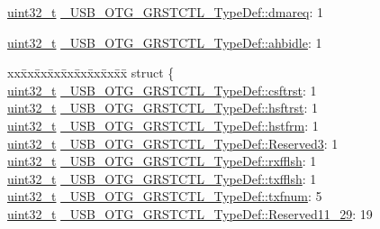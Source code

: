 \begin{DoxyCompactItemize}
\item 
\hyperlink{stdint_8h_a435d1572bf3f880d55459d9805097f62}{uint32\-\_\-t} \hyperlink{group___u_s_b___o_t_g___d_r_i_v_e_r_gad333c8546ac5b74a5a3ef8eb9377268d}{\-\_\-\-U\-S\-B\-\_\-\-O\-T\-G\-\_\-\-G\-R\-S\-T\-C\-T\-L\-\_\-\-Type\-Def\-::dmareq}\-: 1
\item 
\hyperlink{stdint_8h_a435d1572bf3f880d55459d9805097f62}{uint32\-\_\-t} \hyperlink{group___u_s_b___o_t_g___d_r_i_v_e_r_ga4247e798442e482943bbb22ed25cb1eb}{\-\_\-\-U\-S\-B\-\_\-\-O\-T\-G\-\_\-\-G\-R\-S\-T\-C\-T\-L\-\_\-\-Type\-Def\-::ahbidle}\-: 1
\item 
\begin{tabbing}
xx\=xx\=xx\=xx\=xx\=xx\=xx\=xx\=xx\=\kill
struct \{\\
\>\hyperlink{stdint_8h_a435d1572bf3f880d55459d9805097f62}{uint32\_t} \hyperlink{group___u_s_b___o_t_g___d_r_i_v_e_r_gaff6144b9dc68f62487e3e19efcff1a20}{\_USB\_OTG\_GRSTCTL\_TypeDef::csftrst}: 1\\
\>\hyperlink{stdint_8h_a435d1572bf3f880d55459d9805097f62}{uint32\_t} \hyperlink{group___u_s_b___o_t_g___d_r_i_v_e_r_ga0ce950fb04d37c6bfb5ca18fc740b3d3}{\_USB\_OTG\_GRSTCTL\_TypeDef::hsftrst}: 1\\
\>\hyperlink{stdint_8h_a435d1572bf3f880d55459d9805097f62}{uint32\_t} \hyperlink{group___u_s_b___o_t_g___d_r_i_v_e_r_ga74ac2a67ad56bfb0d44539efa6dad5bc}{\_USB\_OTG\_GRSTCTL\_TypeDef::hstfrm}: 1\\
\>\hyperlink{stdint_8h_a435d1572bf3f880d55459d9805097f62}{uint32\_t} \hyperlink{group___u_s_b___o_t_g___d_r_i_v_e_r_ga3ddb35024f1d6b9df8699e9471afda72}{\_USB\_OTG\_GRSTCTL\_TypeDef::Reserved3}: 1\\
\>\hyperlink{stdint_8h_a435d1572bf3f880d55459d9805097f62}{uint32\_t} \hyperlink{group___u_s_b___o_t_g___d_r_i_v_e_r_ga1cc327f836fad208772495510703d944}{\_USB\_OTG\_GRSTCTL\_TypeDef::rxfflsh}: 1\\
\>\hyperlink{stdint_8h_a435d1572bf3f880d55459d9805097f62}{uint32\_t} \hyperlink{group___u_s_b___o_t_g___d_r_i_v_e_r_ga35e4fa074133fbed23d7c251825dc21f}{\_USB\_OTG\_GRSTCTL\_TypeDef::txfflsh}: 1\\
\>\hyperlink{stdint_8h_a435d1572bf3f880d55459d9805097f62}{uint32\_t} \hyperlink{group___u_s_b___o_t_g___d_r_i_v_e_r_gab95417d18c00e88b30adcc7641257683}{\_USB\_OTG\_GRSTCTL\_TypeDef::txfnum}: 5\\
\>\hyperlink{stdint_8h_a435d1572bf3f880d55459d9805097f62}{uint32\_t} \hyperlink{group___u_s_b___o_t_g___d_r_i_v_e_r_gabcbcfe6e19057b32ab213ff12a17af14}{\_USB\_OTG\_GRSTCTL\_TypeDef::Reserved11\_29}: 19\\

\end{tabbing}
\end{DoxyCompactItemize}
